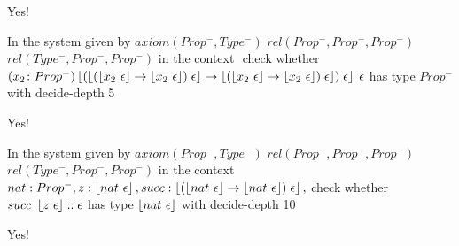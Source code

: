 \documentclass{scrartcl}
\begin{document}
Yes!

In the system given by $axiom (Prop^-,Type^-)$ $rel (Prop^-,Prop^-,Prop^-)$ $rel (Type^-,Prop^-,Prop^-)$  in the context ${}$ check whether $(x_2\colon Prop^-)\left \lfloor (\left \lfloor (\left \lfloor x_2~\epsilon \right \rfloor \to \left \lfloor x_2~\epsilon \right \rfloor) \; \epsilon \right \rfloor \to \left \lfloor (\left \lfloor x_2~\epsilon \right \rfloor \to \left \lfloor x_2~\epsilon \right \rfloor) \; \epsilon \right \rfloor) \; \epsilon \right \rfloor \; \epsilon$ has type $Prop^-$ with decide-depth 5

Yes!

In the system given by $axiom (Prop^-,Type^-)$ $rel (Prop^-,Prop^-,Prop^-)$ $rel (Type^-,Prop^-,Prop^-)$  in the context ${nat:Prop^-,z:\left \lfloor nat~\epsilon \right \rfloor,succ:\left \lfloor (\left \lfloor nat~\epsilon \right \rfloor \to \left \lfloor nat~\epsilon \right \rfloor) \; \epsilon \right \rfloor,}$ check whether $succ~\left \lfloor z~\epsilon \right \rfloor :: \epsilon$ has type $\left \lfloor nat~\epsilon \right \rfloor$ with decide-depth 10

Yes!
\end{document}
